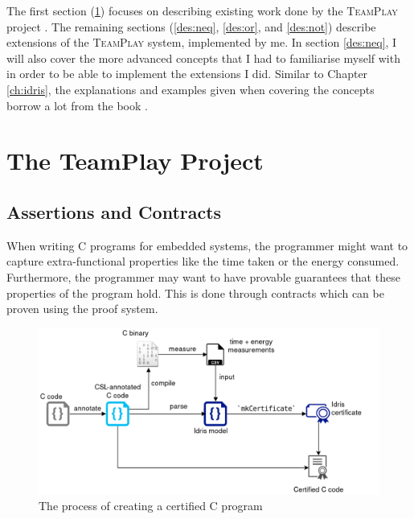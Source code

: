 The first section (\ref{des:tp-dsl}) focuses on describing existing work done by the \textsc{TeamPlay} project \cite{teamplay:d1.1}. The remaining sections (\ref{des:neq}, \ref{des:or}, and \ref{des:not}) describe extensions of the \textsc{TeamPlay} system, implemented by me. In section \ref{des:neq}, I will also cover the more advanced \Idris concepts that I had to familiarise myself with in order to be able to implement the extensions I did. Similar to Chapter \ref{ch:idris}, the explanations and examples given when covering the concepts borrow a lot from the \Idris book \cite{brady_2017}.


\section{The TeamPlay Project}\label{des:tp-dsl}
    \subsection{Assertions and Contracts}
        When writing C programs for embedded systems, the programmer might want to capture extra-functional properties like the time taken or the energy consumed. Furthermore, the programmer may want to have provable guarantees that these properties of the program hold. This is done through contracts which can be proven using the \Idris proof system.
        
        \begin{figure}
            \centering
            \includegraphics[width=\textwidth]{diagrams/process.png}
            \caption{The process of creating a certified C program}
        \end{figure}
        
